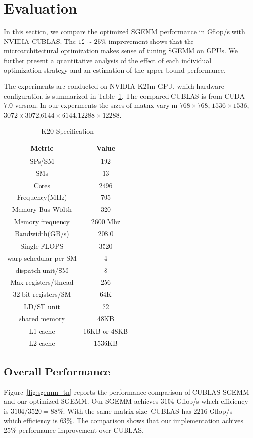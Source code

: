 \documentclass{sig-alternate-05-2015}
\begin{document}
\section{Evaluation}

In this section, we compare the optimized SGEMM performance in Gflop/s with NVIDIA CUBLAS. The $12\sim 25\%$ improvement shows that the microarchitectural optimization makes sense of tuning SGEMM on GPUs.   We further present a quantitative analysis of the effect of each individual optimization strategy and an estimation of the upper bound performance.

The experiments are conducted on NVIDIA K20m GPU, which hardware configuration is summarized in Table~\ref{table:k20}. The compared CUBLAS is from CUDA $7.0$ version. In our experiments the sizes of matrix vary in $768\times768$, $1536\times1536$,$3072\times3072$,$6144\times6144$,$12288\times12288$.

\begin{table}[!t]
\caption{K20 Specification}
\centering
\scalebox{1.0} {
\begin{tabular}{|c||c|}
\hline
Metric& Value\\
\hline
SPs/SM &192\\
\hline
    SMs&13\\
\hline
Cores &2496\\
\hline
Frequency(MHz)&705\\
\hline
Memory Bus Width&320\\
\hline
Memory frequency&2600 Mhz\\
\hline
Bandwidth(GB/s)&208.0\\
\hline
Single FLOPS&3520\\
\hline
warp schedular per SM&4\\
\hline
dispatch unit/SM&8\\
\hline
Max registers/thread&256 \\
\hline
32-bit registers/SM&64K\\
\hline
LD/ST unit&32 \\
\hline
shared memory&48KB\\
\hline
L1 cache&16KB or 48KB\\
\hline
    L2 cache&1536KB\\
\hline
\end{tabular}
}
\label{table:k20}
\end{table}


\subsection{Overall Performance}
Figure~\ref{fig:sgemm_tn} reports the performance comparison of CUBLAS SGEMM and our optimized SGEMM.
Our SGEMM achieves $3104$ Gflop/s which efficiency is $3104/3520=88\%$. With the same matrix size, CUBLAS has $2216$ Gflop/s which efficiency is $63\%$. The comparison shows that our implementation achives 25\% performance improvement over CUBLAS. 
\end{document}

